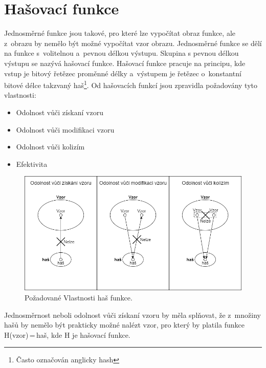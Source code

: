 \section{Hašovací funkce}
\label{sec:hashFunction}
Jednosměrné funkce jsou takové, pro které lze vypočítat obraz funkce, ale z~obrazu by nemělo být možné vypočítat vzor obrazu. Jednosměrné funkce se dělí na funkce s~volitelnou a~pevnou délkou výstupu.\cite{Burda9788021446120ISBN} %
Skupina s pevnou délkou výstupu se nazývá hašovací funkce. Hašovací funkce pracuje na principu, kde vstup je bitový řetězec proměnné délky a~výstupem je řetězec o~konstantní bitové délce takzvaný haš\footnote{Často označován anglicky hash}.\cite{Mao0130669431ISBN}%
\newline
Od hašovacích funkcí jsou zpravidla požadovány tyto vlastnosti:
\begin{itemize}
    \item Odolnost vůči získaní vzoru
    \item Odolnost vůči modifikaci vzoru
    \item Odolnost vůči kolizím
    \item Efektivita
\end{itemize}
\begin{figure}[!h]
  \begin{center}
    \includegraphics[scale=0.4]{obrazky/HashFunction.png}
  \end{center}
  \caption[Požadované vlastnosti haš funkce]{Požadované Vlastnosti haš funkce.\footnotemark\cite{Burda9788021446120ISBN}}
  \label{img:HashFunction}
\end{figure}
Jednosměrnost neboli odolnost vůči získaní vzoru by měla splňovat, že z~množiny hašů by nemělo být prakticky možné nalézt vzor, pro který by platila funkce H(vzor)\,=\,haš, kde H je hašovací funkce.

